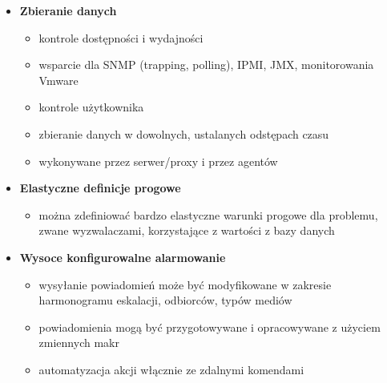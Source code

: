 \documentclass[12pt]{article}
\renewcommand{\_}{\kern-1.5pt\textunderscore\kern-1.5pt}
\begin{document}
\begin{itemize}
\begin{itemize}
\begin{itemize}
	\item \textbf{Zbieranie danych}\par

\begin{itemize}
	\item kontrole dostępności i wydajności\par

	\item wsparcie dla SNMP (trapping, polling), IPMI, JMX, monitorowania Vmware\par

	\item kontrole użytkownika\par

	\item zbieranie danych w dowolnych, ustalanych odstępach czasu\par

	\item wykonywane przez serwer/proxy i przez agentów\par


\end{itemize}
	\item \textbf{Elastyczne definicje progowe}\par

\begin{itemize}
	\item można zdefiniować bardzo elastyczne warunki progowe dla problemu, zwane wyzwalaczami, korzystające z wartości z bazy danych\par


\end{itemize}
	\item \textbf{Wysoce konfigurowalne alarmowanie}\par

\begin{itemize}
	\item wysyłanie powiadomień może być modyfikowane w zakresie harmonogramu eskalacji, odbiorców, typów mediów\par

	\item powiadomienia mogą być przygotowywane i opracowywane z użyciem zmiennych makr\par

	\item automatyzacja akcji włącznie ze zdalnymi komendami\par



\end{itemize}
\end{itemize}
\end{itemize}
\end{itemize}
\end{document}
